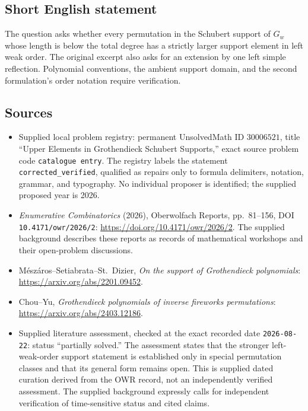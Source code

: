\documentclass[11pt]{article}
\begin{document}
\subsection{Short English statement}
The question asks whether every permutation in the Schubert support of \(G_w\) whose length is below the total degree has a strictly larger support element in left weak order. The original excerpt also asks for an extension by one left simple reflection. Polynomial conventions, the ambient support domain, and the second formulation's order notation require verification.
\subsection{Sources}
\begin{itemize}
\item Supplied local problem registry: permanent UnsolvedMath ID \(30006521\), title ``Upper Elements in Grothendieck Schubert Supports,'' exact source problem code \texttt{catalogue entry}. The registry labels the statement \texttt{corrected\_verified}, qualified as repairs only to formula delimiters, notation, grammar, and typography. No individual proposer is identified; the supplied proposed year is 2026.
\item \emph{Enumerative Combinatorics} (2026), Oberwolfach Reports, pp.~81--156, DOI \texttt{10.4171/owr/2026/2}: \url{https://doi.org/10.4171/owr/2026/2}. The supplied background describes these reports as records of mathematical workshops and their open-problem discussions.
\item Mészáros--Setiabrata--St.~Dizier, \emph{On the support of Grothendieck polynomials}: \url{https://arxiv.org/abs/2201.09452}.
\item Chou--Yu, \emph{Grothendieck polynomials of inverse fireworks permutations}: \url{https://arxiv.org/abs/2403.12186}.
\item Supplied literature assessment, checked at the exact recorded date \texttt{2026-08-22}: status ``partially solved.'' The assessment states that the stronger left-weak-order support statement is established only in special permutation classes and that its general form remains open. This is supplied dated curation derived from the OWR record, not an independently verified assessment. The supplied background expressly calls for independent verification of time-sensitive status and cited claims.
\end{itemize}
\end{document}
